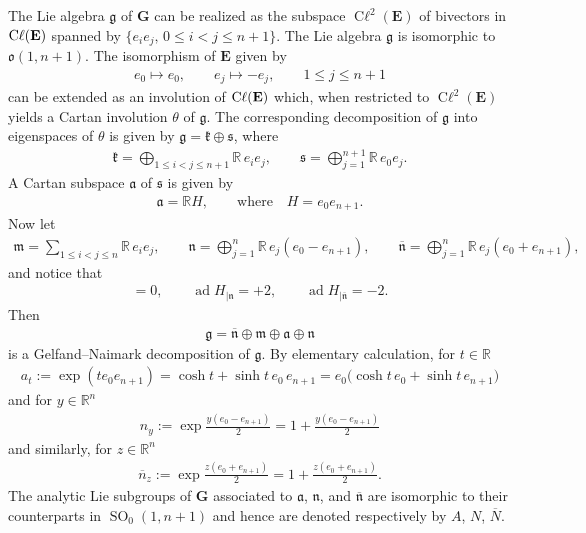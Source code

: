 \documentclass[pdftex]{sigma}
\DeclareMathOperator{\cl}{C\ell} %
\DeclareMathOperator{\ad}{ad}
\DeclareMathOperator{\SO}{SO}
\numberwithin{equation}{section}
\begin{document}
The Lie algebra $\mathbf {\mathfrak g}$ of $\mathbf G$ can be realized as the subspace $\cl^2(\mathbf E)$ of bivectors in $\cl(\bf E)$ spanned by $\{e_ie_j,\, 0\leq i<j\leq n+1\}$.
The Lie algebra $\mathfrak g$ is isomorphic to $\mathfrak o(1,n+1)$. The isomorphism of $\mathbf E$ given by
 \begin{gather*}
 e_0 \mapsto e_0,\qquad e_j \mapsto - e_j,\qquad
 1\leq j\leq n+1
 \end{gather*}
 can be extended as an involution of $\cl(\bf E)$ which, when restricted to
$\cl^2(\mathbf E)$ yields a Cartan involution $\theta$ of $\mathfrak g$. The corresponding decomposition of $\mathfrak g$ into eigenspaces of $\theta$ is given by $\mathfrak g = \mathfrak k\oplus \mathfrak s$, where
\begin{gather*}
\mathfrak k = \bigoplus_{1\leq i<j\leq n+1} \mathbb R\, e_ie_j,\qquad
\mathfrak s = \bigoplus_{j=1}^{n+1}\mathbb R\, e_0e_j .
\end{gather*}
A Cartan subspace $\mathfrak a$ of $\mathfrak s$ is given by
\begin{gather*}
\mathfrak a = \mathbb R H,\qquad \text{where}\quad H=e_0e_{n+1} .
\end{gather*}
Now let
\begin{gather*}
\mathfrak m = \sum_{1\leq i<j\leq n} \mathbb R\, e_ie_j,\qquad
\mathfrak n = \bigoplus_{j=1}^n \mathbb R\, e_j(e_0-e_{n+1}),\qquad \overline{\mathfrak n} = \bigoplus_{j=1}^n \mathbb R\, e_j(e_0+e_{n+1}) ,
\end{gather*}
and notice that
\begin{gather*}
[H,\mathfrak m] = 0,\qquad
\ad H_{\vert \mathfrak n} = +2, \qquad
\ad H_{\vert \overline{\mathfrak n}} = -2 .
\end{gather*}
Then
\begin{gather*}
\mathfrak g = \overline{\mathfrak n}\oplus \mathfrak m\oplus \mathfrak a\oplus \mathfrak n
\end{gather*}
is a Gelfand--Naimark decomposition of $\mathfrak g$. By elementary calculation, for $t\in \mathbb R$
\begin{gather*}
a_t:=\exp(te_0e_{n+1}) = \cosh t +\sinh t\, e_0\, e_{n+1} = e_0\big(\cosh t \,e_0+\sinh t \,e_{n+1}\big)
\end{gather*}
and for $y\in \mathbb R^n$
\begin{gather*}
n_y := \exp \frac{y(e_0-e_{n+1})}{2} = 1+\frac{y(e_0-e_{n+1})}{2}
\end{gather*}
and similarly, for $z\in \mathbb R^n$
\begin{gather*}
\overline n_z := \exp \frac{z(e_0+e_{n+1})}{2} = 1+\frac{z(e_0+e_{n+1})}{2} .
\end{gather*}
The analytic Lie subgroups of $\mathbf G$ associated to $\mathfrak a$, $\mathfrak n$, and $\mathfrak {\overline n}$ are isomorphic to their counterparts in $\SO_0(1,n+1)$ and hence are denoted respectively by $A$, $N$, $\overline N$.
\end{document}
